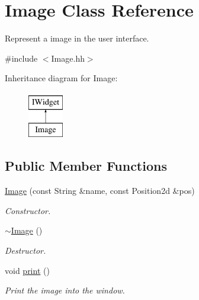 \hypertarget{classImage}{}\section{Image Class Reference}
\label{classImage}


Represent a image in the user interface.  




{\ttfamily \#include $<$Image.\+hh$>$}

Inheritance diagram for Image\+:\begin{figure}[H]
\begin{center}
\leavevmode
\includegraphics[height=2.000000cm]{classImage}
\end{center}
\end{figure}
\subsection*{Public Member Functions}
\begin{DoxyCompactItemize}
\item 
\hyperlink{classImage_aca308a45e7c53ec95e244863cb31a738}{Image} (const String \&name, const Position2d \&pos)
\begin{DoxyCompactList}\small\item\em Constructor. \end{DoxyCompactList}\item 
\mbox{\label{classImage_a0294f63700543e11c0f0da85601c7ae5}} 
\hyperlink{classImage_a0294f63700543e11c0f0da85601c7ae5}{$\sim$\+Image} ()
\begin{DoxyCompactList}\small\item\em Destructor. \end{DoxyCompactList}\item 
\mbox{\label{classImage_a1c98ca475ce45aaa71e8a91a2a781ff5}} 
void \hyperlink{classImage_a1c98ca475ce45aaa71e8a91a2a781ff5}{print} ()
\begin{DoxyCompactList}\small\item\em Print the image into the window. \end{DoxyCompactList}\end{DoxyCompactItemize}


